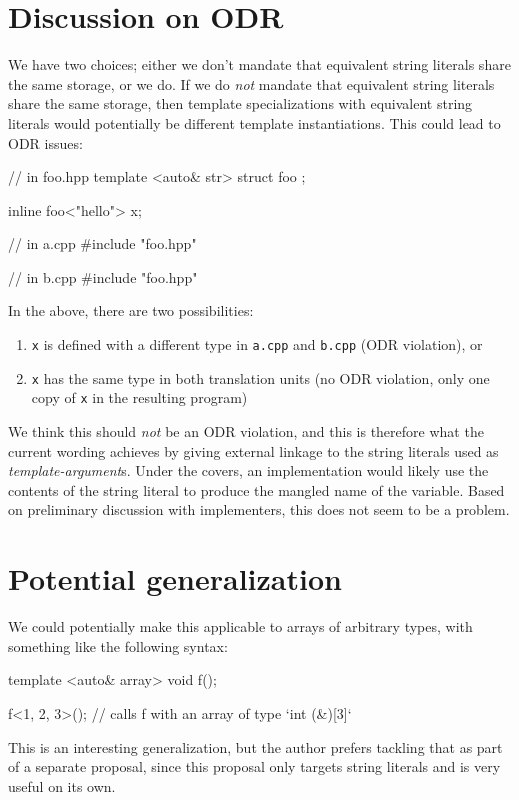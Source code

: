 \documentclass{wg21}
\newcommand{\cc}[1]{\texttt{#1}}
\begin{document}
\section{Discussion on ODR}
We have two choices; either we don't mandate that equivalent string literals
share the same storage, or we do. If we do \textit{not} mandate that equivalent
string literals share the same storage, then template specializations with
equivalent string literals would potentially be different template
instantiations. This could lead to ODR issues:

\begin{cpp}
// in foo.hpp
template <auto& str>
struct foo { };

inline foo<"hello"> x;

// in a.cpp
#include "foo.hpp"

// in b.cpp
#include "foo.hpp"
\end{cpp}

In the above, there are two possibilities:
\begin{enumerate}
  \item \cc{x} is defined with a different type in \cc{a.cpp} and \cc{b.cpp}
        (ODR violation), or
  \item \cc{x} has the same type in both translation units (no ODR violation,
        only one copy of \cc{x} in the resulting program)
\end{enumerate}

We think this should \textit{not} be an ODR violation, and this is therefore
what the current wording achieves by giving external linkage to the string
literals used as \textit{template-argument}s. Under the covers, an
implementation would likely use the contents of the string literal to
produce the mangled name of the variable. Based on preliminary discussion
with implementers, this does not seem to be a problem.


\section{Potential generalization}
We could potentially make this applicable to arrays of arbitrary types,
with something like the following syntax:

\begin{cpp}
template <auto& array> void f();

f<{1, 2, 3}>(); // calls f with an array of type `int (&)[3]`
\end{cpp}

This is an interesting generalization, but the author prefers tackling
that as part of a separate proposal, since this proposal only targets
string literals and is very useful on its own.
\end{document}
